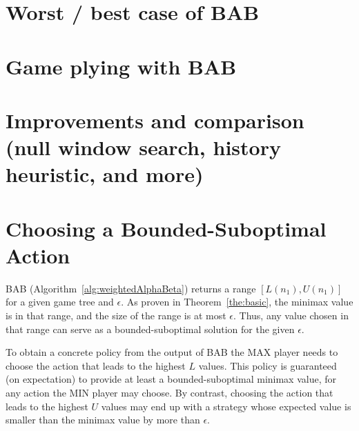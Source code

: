 \documentclass[letterpaper]{article} %
\newcommand{\pess}{\mathit{L}}
\newcommand{\opti}{\mathit{U}}
\newcommand{\rootnode}{\mathit{n_1}}
\begin{document}

\section{Worst / best case of BAB}




\section{Game plying with BAB}




\section{Improvements and comparison (null window search, history heuristic, and more)}




\section{Choosing a Bounded-Suboptimal Action}
\label{sec:action}
BAB (Algorithm~\ref{alg:weightedAlphaBeta}) returns a range $[\pess(\rootnode), \opti(\rootnode)]$ for a given game tree and $\epsilon$. As proven in Theorem~\ref{the:basic}, the minimax value is in that range, and the size of the range is at most $\epsilon$. Thus, any value chosen in that range can serve as a bounded-suboptimal solution for the given $\epsilon$.

To obtain a concrete policy from the output of BAB the MAX player needs to choose the action that leads to the highest $\pess$ values. This policy is guaranteed (on expectation) to provide at least a bounded-suboptimal minimax value, for any action the MIN player may choose. By contrast, choosing the action that leads to the highest $\opti$ values may end up with a strategy whose expected value is smaller than the minimax value by more than $\epsilon$. %
\end{document}
